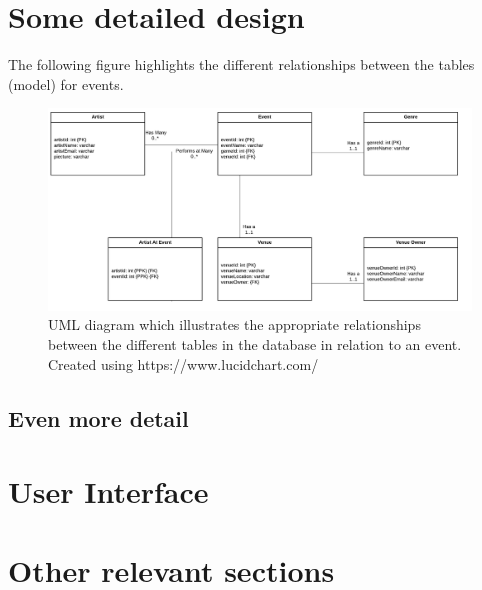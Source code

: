 \section{Some detailed design}
The following figure highlights the different relationships between the tables (model) for events.
\begin{figure}[H]
\includegraphics[width=\textwidth,height=\textheight,keepaspectratio]{images/events}
\caption{UML diagram which illustrates the appropriate relationships between the different tables in the database in relation to an event. Created using https://www.lucidchart.com/}

\end{figure}
\subsection{Even more detail}

\section{User Interface}

\section{Other relevant sections}